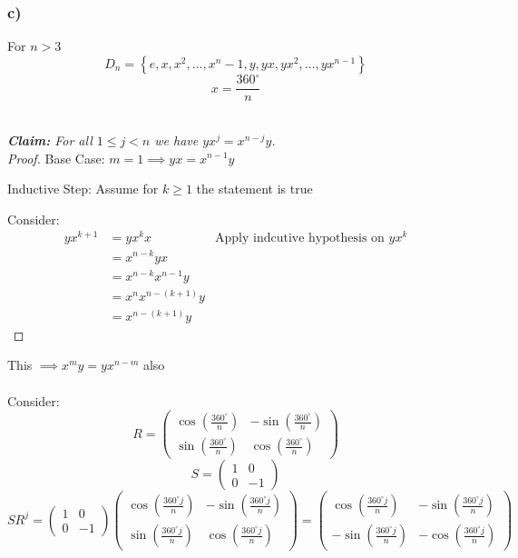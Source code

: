 \documentclass[12pt, letterpaper]{article}
\theoremstyle{definition}
\renewcommand{\t}[1]{\text{#1}}
\begin{document}
\newpage
\subsubsection*{c)}
For $n>3$
\[D_n=\left\{ e,x,x^2,\dots,x^n-1,y,yx,yx^2,\dots,yx^{n-1} \right\}\]
\[x=\dfrac{360^\circ}{n}\]\\
\begin{proof}[\textbf{Claim:} For all \(1\leq j < n\) we have \(yx^j=x^{n-j}y\)]
    \phantom{text}\\
    \textit{Proof.} Base Case: \(m=1 \implies yx=x^{n-1}y\) \checkmark

    Inductive Step: Assume for \(k \geq 1\) the statement is true

    Consider: 
    \begin{align*}
        yx^{k+1}&=yx^kx &\t{Apply indcutive hypothesis on } yx^k\\
                &=x^{n-k}yx \\
                &=x^{n-k}x^{n-1}y\\
                &=x^{n}x^{n-(k+1)}y\\
                &=x^{n-(k+1)}y
    \end{align*}
\end{proof}
This $\implies x^my=yx^{n-m}$ also\\
\phantom{text}\\
Consider: \[
R = \begin{pmatrix}
\cos\left(\frac{360^\circ }{n}\right) & -\sin\left(\frac{360^\circ }{n}\right) \\
\sin\left(\frac{360^\circ }{n}\right) & \cos\left(\frac{360^\circ }{n}\right)
\end{pmatrix}
\]
\[
S = \begin{pmatrix}
1 & 0 \\
0 & -1
\end{pmatrix}
\]
\[
S R^j = \begin{pmatrix}
1 & 0 \\
0 & -1
\end{pmatrix}
\begin{pmatrix}
\cos\left(\frac{360^\circ j}{n}\right) & -\sin\left(\frac{360^\circ j}{n}\right) \\
\sin\left(\frac{360^\circ j}{n}\right) & \cos\left(\frac{360^\circ j}{n}\right)
\end{pmatrix}
= \begin{pmatrix}
\cos\left(\frac{360^\circ j}{n}\right) & -\sin\left(\frac{360^\circ j}{n}\right) \\
-\sin\left(\frac{360^\circ j}{n}\right) & -\cos\left(\frac{360^\circ j}{n}\right)
\end{pmatrix}
\]
\end{document}
